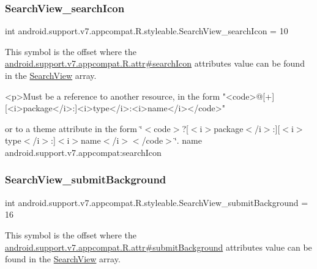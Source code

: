 \subsubsection{\texorpdfstring{Search\+View\+\_\+search\+Icon}{SearchView\_searchIcon}}
{\footnotesize\ttfamily int android.\+support.\+v7.\+appcompat.\+R.\+styleable.\+Search\+View\+\_\+search\+Icon = 10\hspace{0.3cm}{\ttfamily [static]}}

This symbol is the offset where the \hyperlink{classandroid_1_1support_1_1v7_1_1appcompat_1_1R_1_1attr_a4b1621015b9ec79e6c6c880ccde1250d}{android.\+support.\+v7.\+appcompat.\+R.\+attr\#search\+Icon} attribute\textquotesingle{}s value can be found in the \hyperlink{classandroid_1_1support_1_1v7_1_1appcompat_1_1R_1_1styleable_a01af09df9e38f1e4f57165c3d3cee9fe}{Search\+View} array.

\begin{DoxyVerb}      <p>Must be a reference to another resource, in the form "<code>@[+][<i>package</i>:]<i>type</i>:<i>name</i></code>"
\end{DoxyVerb}
 or to a theme attribute in the form \char`\"{}$<$code$>$?\mbox{[}$<$i$>$package$<$/i$>$\+:\mbox{]}\mbox{[}$<$i$>$type$<$/i$>$\+:\mbox{]}$<$i$>$name$<$/i$>$$<$/code$>$\char`\"{}.  name android.\+support.\+v7.\+appcompat\+:search\+Icon \mbox{\label{classandroid_1_1support_1_1v7_1_1appcompat_1_1R_1_1styleable_a7d61d4e0aeb32c5c70b0aabb85cf4eb6}} 
\subsubsection{\texorpdfstring{Search\+View\+\_\+submit\+Background}{SearchView\_submitBackground}}
{\footnotesize\ttfamily int android.\+support.\+v7.\+appcompat.\+R.\+styleable.\+Search\+View\+\_\+submit\+Background = 16\hspace{0.3cm}{\ttfamily [static]}}

This symbol is the offset where the \hyperlink{classandroid_1_1support_1_1v7_1_1appcompat_1_1R_1_1attr_a5f99a93e3f35a2e5c9938fcad7c4e711}{android.\+support.\+v7.\+appcompat.\+R.\+attr\#submit\+Background} attribute\textquotesingle{}s value can be found in the \hyperlink{classandroid_1_1support_1_1v7_1_1appcompat_1_1R_1_1styleable_a01af09df9e38f1e4f57165c3d3cee9fe}{Search\+View} array.

